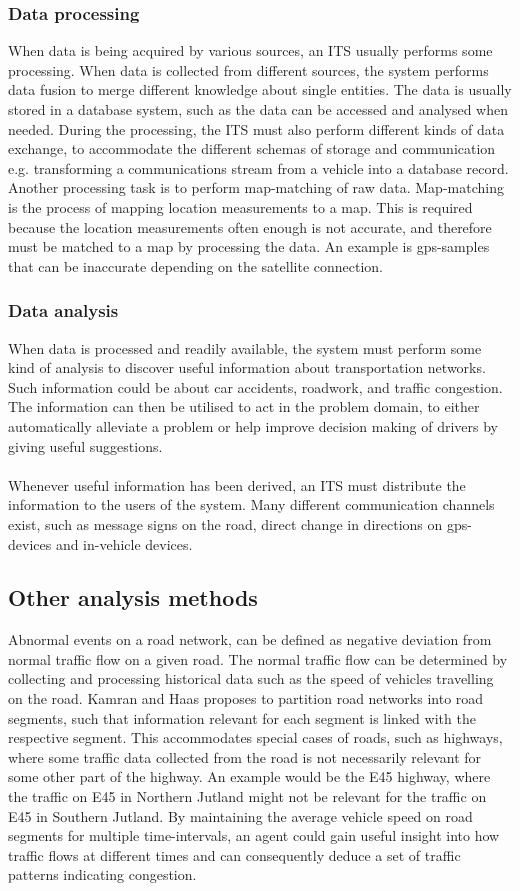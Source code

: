 \subsubsection*{Data processing}
When data is being acquired by various sources, an ITS usually performs some processing. When data is collected from different sources, the system performs data fusion to merge different knowledge about single entities. The data is usually stored in a database system, such as the data can be accessed and analysed when needed. During the processing, the ITS must also perform different kinds of data exchange, to accommodate the different schemas of storage and communication e.g. transforming a communications stream from a vehicle into a database record.\\
Another processing task is to perform map-matching of raw data. Map-matching is the process of mapping location measurements to a map. This is required because the location measurements often enough is not accurate, and therefore must be matched to a map by processing the data. An example is gps-samples that can be inaccurate depending on the satellite connection.

\subsubsection*{Data analysis}
When data is processed and readily available, the system must perform some kind of analysis to discover useful information about transportation networks. Such information could be about car accidents, roadwork, and traffic congestion. The information can then be utilised to act in the problem domain, to either automatically alleviate a problem or help improve decision making of drivers by giving useful suggestions.
\\\\
Whenever useful information has been derived, an ITS must distribute the information to the users of the system. Many different communication channels exist, such as message signs on the road, direct change in directions on gps-devices and in-vehicle devices.

\subsection{Other analysis methods}
Abnormal events on a road network, can be defined as negative deviation from normal traffic flow on a given road. The normal traffic flow can be determined by collecting and processing historical data such as the speed of vehicles travelling on the road. Kamran and Haas\cite{KamranHaas2007} proposes to partition road networks into road segments, such that information relevant for each segment is linked with the respective segment. This accommodates special cases of roads, such as highways, where some traffic data collected from the road is not necessarily relevant for some other part of the highway. An example would be the E45 highway, where the traffic on E45 in Northern Jutland might not be relevant for the traffic on E45 in Southern Jutland. By maintaining the average vehicle speed on road segments for multiple time-intervals, an agent could gain useful insight into how traffic flows at different times and can consequently deduce a set of traffic patterns indicating congestion.
